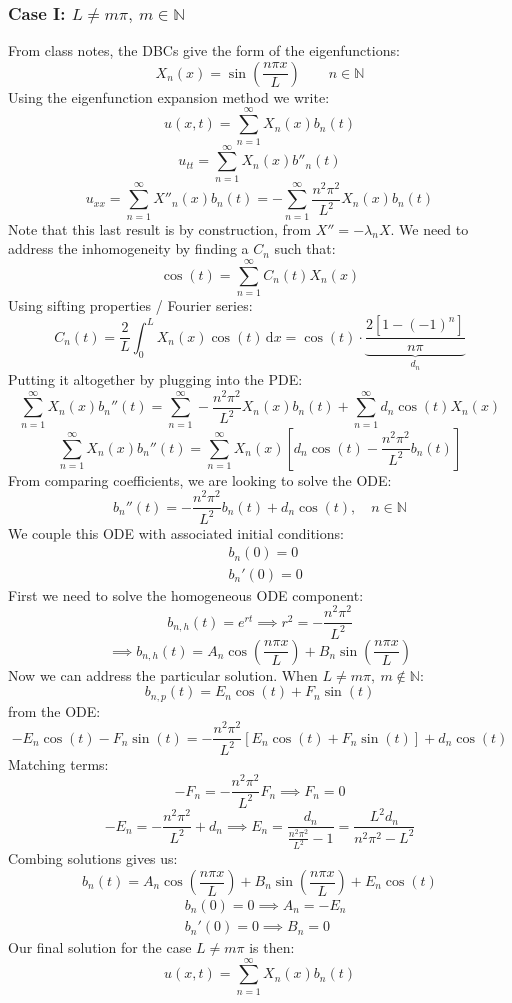 \documentclass[12pt]{article}
\begin{document}
\subsubsection{Case I: \(L\ne m\pi,\ m\in\mathbb{N}\)}
From class notes, the DBCs give the form of the eigenfunctions:
\[X_n(x)=\sin\left(\frac{n\pi x}{L}\right)\qquad n\in\mathbb{N}\]
Using the eigenfunction expansion method we write:
\[u(x,t)=\sum_{n=1}^\infty X_n(x)b_n(t)\]
\[u_{tt}=\sum^\infty_{n=1}X_n(x)b''_n(t)\]
\[u_{xx}=\sum^\infty_{n=1}X''_n(x)b_n(t)=-\sum^\infty_{n=1}\frac{n^2\pi^2}{L^2}X_n(x)b_n(t)\]
Note that this last result is by construction, from \(X''=-\lambda_nX\). We need to address the inhomogeneity by finding a \(C_n\) such that:
\[\cos(t)=\sum^\infty_{n=1}C_n(t)X_n(x)\]
Using sifting properties / Fourier series:
\[C_n(t)=\frac{2}{L}\int^L_0X_n(x)\cos(t)\,\text{d}x=\cos(t)\cdot\underbrace{\frac{2[1-(-1)^n]}{n\pi}}_{d_n}\]
Putting it altogether by plugging into the PDE:
\[\sum^\infty_{n=1}X_n(x)b_n''(t)=\sum^\infty_{n=1}-\frac{n^2\pi^2}{L^2}X_n(x)b_n(t)+\sum^\infty_{n=1}d_n\cos(t)X_n(x)\]
\[\sum^\infty_{n=1}X_n(x)b_n''(t)=\sum^\infty_{n=1}X_n(x)\left[d_n\cos(t)-\frac{n^2\pi^2}{L^2}b_n(t)\right]\]
From comparing coefficients, we are looking to solve the ODE:
\[b_n''(t)=-\frac{n^2\pi^2}{L^2}b_n(t)+d_n\cos(t),\quad n\in\mathbb{N}\]
We couple this ODE with associated initial conditions:
\begin{align*}
    &b_n(0)=0 \\
    &b_n'(0)=0
\end{align*}
First we need to solve the homogeneous ODE component:
\[b_{n,h}(t)=e^{rt}\implies r^2=-\frac{n^2\pi^2}{L^2}\]
\[\implies b_{n,h}(t)=A_n\cos\left(\frac{n\pi x}{L}\right)+B_n\sin\left(\frac{n\pi x}{L}\right)\]
Now we can address the particular solution. When \(L\ne m\pi,\ m\notin\mathbb{N}\):
\[b_{n,p}(t)=E_n\cos(t)+F_n\sin(t)\]
from the ODE:
\[-E_n\cos(t)-F_n\sin(t)=-\frac{n^2\pi^2}{L^2}\left[E_n\cos(t)+F_n\sin(t)\right]+d_n\cos(t)\]
Matching terms:
\[-F_n=-\frac{n^2\pi^2}{L^2}F_n\implies F_n=0\]
\[-E_n=-\frac{n^2\pi^2}{L^2}+d_n\implies E_n=\frac{d_n}{\frac{n^2\pi^2}{L^2}-1}=\frac{L^2d_n}{n^2\pi^2-L^2}\]
Combing solutions gives us:
\[b_n(t)=A_n\cos\left(\frac{n\pi x}{L}\right)+B_n\sin\left(\frac{n\pi x}{L}\right)+E_n\cos(t)\]
\begin{align*}
    &b_n(0)=0\implies A_n=-E_n \\
    &b_n'(0)=0\implies B_n=0
\end{align*}
Our final solution for the case \(L\ne m\pi\) is then:
\begin{equation*}
    \boxed{u(x,t)=\sum^\infty_{n=1}X_n(x)b_n(t)}
\end{equation*}
\end{document}
